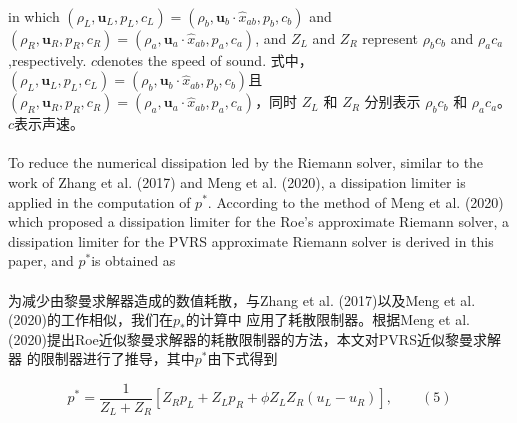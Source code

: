 \documentclass[UTF8]{ctexart}
\begin{document}
{{\paragraph{\quad}in which $(\rho_L, \mathbf{u}_L, p_L, c_L) = (\rho_b, \mathbf{u}_b \cdot \hat{x}_{ab}, p_b, c_b)$ and 
                $(\rho_R, \mathbf{u}_R, p_R, c_R) = (\rho_a, \mathbf{u}_a \cdot \hat{x}_{ab}, p_a, c_a)$, and $Z_L$ and
                $Z_R$ represent $\rho_b c_b$ and $\rho_a c_a$,respectively. $c $denotes the speed of sound.
\paragrap{\quad}式中，$(\rho_L, \mathbf{u}_L, p_L, c_L) = (\rho_b, \mathbf{u}_b \cdot \hat{x}_{ab}, p_b, c_b)$且
                $(\rho_R, \mathbf{u}_R, p_R, c_R) = (\rho_a, \mathbf{u}_a \cdot \hat{x}_{ab}, p_a, c_a)$，同时 $Z_L$ 和
                $Z_R$ 分别表示 $\rho_b c_b$ 和 $\rho_a c_a$。$c$表示声速。
            
\paragraph{\quad}To reduce the numerical dissipation led by the Riemann solver, similar to the work 
                of Zhang et al. (2017) and Meng et al. (2020), a dissipation limiter is applied in the 
                computation of $p^*$. According to the method of Meng et al. (2020) which proposed a 
                dissipation limiter for the Roe's approximate Riemann solver, a dissipation limiter 
                for the PVRS approximate Riemann solver is derived in this paper, and $p^*$is obtained as
\paragraph{\quad}为减少由黎曼求解器造成的数值耗散，与Zhang et al. (2017)以及Meng et al. (2020)的工作相似，我们在$p_*$的计算中
                应用了耗散限制器。根据Meng et al. (2020)提出Roe近似黎曼求解器的耗散限制器的方法，本文对PVRS近似黎曼求解器
                的限制器进行了推导，其中$p^*$由下式得到
    
\begin{equation}
   p^*=\frac{1}{Z_L+Z_R}[Z_R p_L+Z_L p_R + \phi Z_L Z_R(u_L - u_R)], \qquad (5)
\end{equation}

}}
\end{document}
